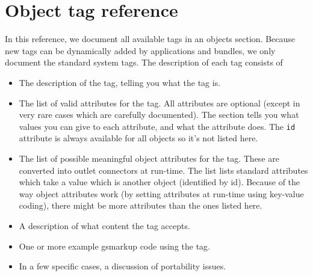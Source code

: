 
\section{Object tag reference}

In this reference, we document all available tags in an objects
section.  Because new tags can be dynamically added by applications
and bundles, we only document the standard system tags.  The
description of each tag consists of
\begin{itemize}
\item The description of the tag, telling you what the tag is.
\item The list of valid attributes for the tag.  All attributes are optional 
(except in very rare cases which are carefully documented).  
The section tells you what values you can give to each attribute, and
what the attribute does.  The \texttt{id} attribute is always
available for all objects so it's not listed here.
\item The list of possible meaningful object attributes for the tag.
These are converted into outlet connectors at run-time.  The list
lists standard attributes which take a value which is another object
(identified by id).  Because of the way object attributes work (by
setting attributes at run-time using key-value coding), there might be
more attributes than the ones listed here.
\item A description of what content the tag accepts.
\item One or more example gsmarkup code using the tag.
\item In a few specific cases, a discussion of portability issues.
\end{itemize}

%
%


